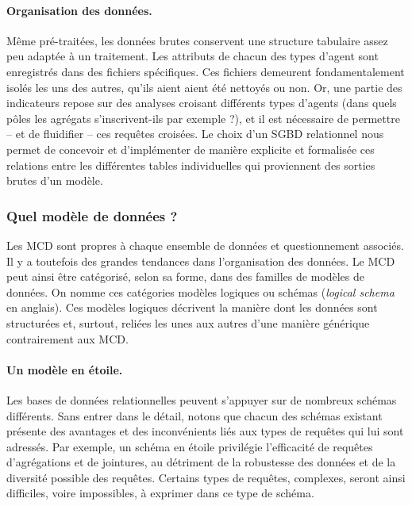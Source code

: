 \paragraph{Organisation des données.}
Même pré-traitées, les données brutes conservent une structure tabulaire assez peu adaptée à un traitement.
Les attributs de chacun des types d'agent sont enregistrés dans des fichiers spécifiques.
Ces fichiers demeurent fondamentalement isolés les uns des autres, qu'ils aient aient été nettoyés ou non.
Or, une partie des indicateurs repose sur des analyses croisant différents types d'agents (dans quels pôles les agrégats s'inscrivent-ils par exemple ?), et il est nécessaire de permettre -- et de fluidifier -- ces requêtes croisées.
Le choix d'un SGBD relationnel nous permet de concevoir et d'implémenter de manière explicite et formalisée ces relations entre les différentes tables individuelles qui proviennent des sorties brutes d'un modèle.



\subsubsection{Quel modèle de données ?}

Les MCD sont propres à chaque ensemble de données et questionnement associés.
Il y a toutefois des grandes tendances dans l'organisation des données.
Le MCD peut ainsi être catégorisé, selon sa forme, dans des familles de modèles de données.
On nomme ces catégories \og modèles logiques\fg{} ou \og schémas\fg{} (\textit{logical schema} en anglais).
Ces modèles logiques décrivent la manière dont les données sont structurées et, surtout, reliées les unes aux autres d'une manière générique contrairement aux MCD.

\paragraph{Un modèle \og en étoile\fg{}.}

Les bases de données relationnelles peuvent s'appuyer sur de nombreux schémas différents.
Sans entrer dans le détail, notons que chacun des schémas existant présente des avantages et des inconvénients liés aux types de requêtes qui lui sont adressés.
Par exemple, un schéma \og en étoile\fg{} \autocite{noauthor_star_2018} privilégie l'efficacité de requêtes d'agrégations et de jointures, au détriment de la robustesse des données et de la diversité possible des requêtes.
Certains types de requêtes, complexes, seront ainsi difficiles, voire impossibles, à exprimer dans ce type de schéma.

